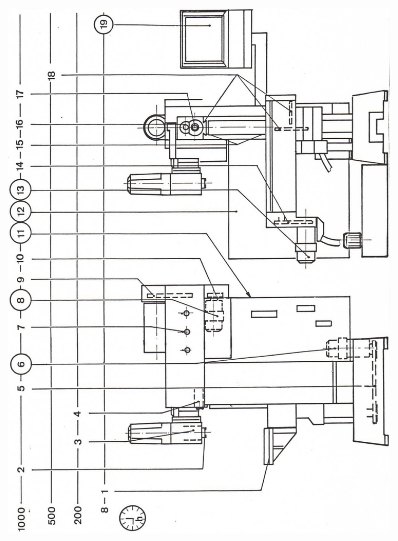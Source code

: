 \begin{figure}[H]
    \centering
    \includegraphics[width=0.9\textwidth]{images/chapter7/maintenance_plan_diagram.jpg}
    \label{fig:maintenance_plan}
\end{figure}


